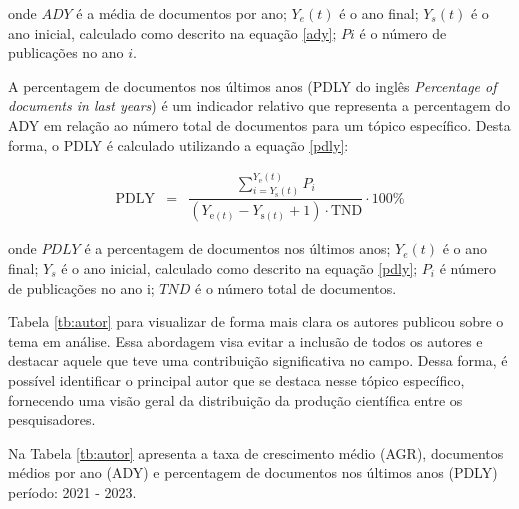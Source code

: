 \noindent onde $ADY$ é a média de documentos por ano; $Y_e(t)$ é o ano final; $Y_s(t)$ é o ano inicial, calculado como descrito na equação \eqref{ady}; $Pi$ é o número de publicações no ano $i$.

A percentagem de documentos nos últimos anos (PDLY do inglês \textit{Percentage of documents in last years}) é um indicador relativo que representa a percentagem do ADY em relação ao número total de documentos para um tópico específico. Desta forma, o PDLY é calculado utilizando a equação \eqref{pdly}:

\begin{eqnarray}
	\mathrm{PDLY}&=&\dfrac{\sum_{i={Y_{\mathrm{s}}(t)}}^{Y_{\mathrm{e}}(t)} P_i}{\left(Y_{\mathrm{e}(t)}-Y_{\mathrm{s}(t)}+1\right) \cdot \mathrm{TND}} \cdot 100 \%\label{pdly}
\end{eqnarray}

\noindent onde $PDLY$ é a percentagem de documentos nos últimos anos; $Y_e(t)$ é o ano final; $Y_s$ é o ano inicial, calculado como descrito na equação \eqref{pdly}; $P_i$ é número de publicações no ano i; $TND$ é o número total de documentos.

Tabela \ref{tb:autor} para visualizar de forma mais clara os autores publicou sobre o tema em análise. Essa abordagem visa evitar a inclusão de todos os autores e destacar aquele que teve uma contribuição significativa no campo. Dessa forma, é possível identificar o principal autor que se destaca nesse tópico específico, fornecendo uma visão geral da distribuição da produção científica entre os pesquisadores.

Na Tabela \ref{tb:autor} apresenta a taxa de crescimento médio (AGR), documentos médios por ano (ADY) e percentagem de documentos nos últimos anos (PDLY) período: 2021 - 2023.

